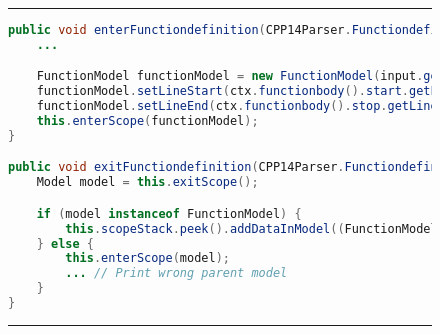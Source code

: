 \begin{figure}[H]
\noindent\rule{\textwidth}{1pt}
\begin{lstlisting}[language=Java, caption={Antlr CPP listener example}, label={lst:antlrCPPListenerExample}]
public void enterFunctiondefinition(CPP14Parser.FunctiondefinitionContext ctx) {
	...

	FunctionModel functionModel = new FunctionModel(input.getText(interval));
	functionModel.setLineStart(ctx.functionbody().start.getLine());
	functionModel.setLineEnd(ctx.functionbody().stop.getLine());
	this.enterScope(functionModel);
}

public void exitFunctiondefinition(CPP14Parser.FunctiondefinitionContext ctx) {
	Model model = this.exitScope();

	if (model instanceof FunctionModel) {
		this.scopeStack.peek().addDataInModel((FunctionModel) model);
	} else {
		this.enterScope(model);
		... // Print wrong parent model
	}
}
\end{lstlisting}
\noindent\rule{\textwidth}{1pt}
\end{figure}